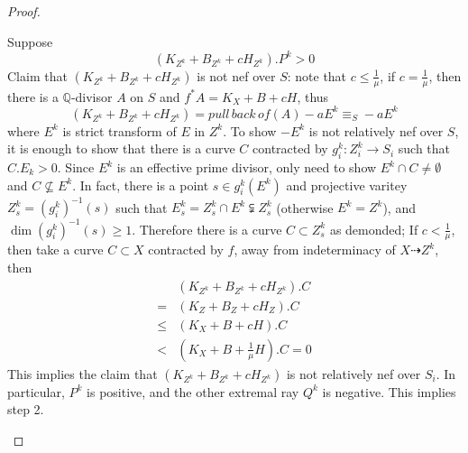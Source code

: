 \documentclass{article}
\begin{document}
\begin{proof}
\begin{enumerate}[Step 1]
Suppose
$$ (K_{Z^k}+B_{Z^k}+cH_{Z^k}).P^k>0 $$
Claim that $ (K_{Z^k}+B_{Z^k}+cH_{Z^k}) $ is not nef over $ S $: note that $ c\leqslant \frac{1}{\mu} $, if $ c=\frac{1}{\mu} $, then there is a $ \mathbb{Q} $-divisor $ A $ on $ S $ and $ f^*A=K_X+B+cH $, thus
$$ (K_{Z^k}+B_{Z^k}+cH_{Z^k})=pull\,back\,of (A)-aE^k\equiv_S -aE^k $$
where $ E^k $ is strict transform of $ E $ in $ Z^k $. To show $ -E^k $ is not relatively nef over $ S $, it is enough to show that there is a curve $ C $ contracted by $ g_i^k:Z^k_i\to S_i $ such that $ C.E_k>0 $.  Since $ E^k $ is an effective prime divisor, only need to show $ E^k\cap C\neq \emptyset $ and $ C\nsubseteq E^k $. In fact, there is a point $ s\in g_i^k(E^k) $ and projective varitey $ Z^k_s=(g_i^k)^{-1}(s) $ such that $ E^k_s=Z^k_s\cap E^k\subsetneqq Z^k_s $ (otherwise $ E^k=Z^k $), and $ \dim (g_i^k)^{-1}(s)\geqslant 1 $. Therefore there is a curve $ C\subset Z^k_s $ as demonded; If $ c<\frac{1}{\mu} $, then take a curve $ C\subset X $ contracted by $ f $, away from indeterminacy of $ X\dashrightarrow Z^k $, then
\begin{equation*}
\begin{aligned}
&(K_{Z^k}+B_{Z^k}+cH_{Z^k}).C\\
=&   (K_{Z}+B_{Z}+cH_{Z}).C\\
\leqslant& (K_{X}+B+cH).C\\
<&(K_X+B+\frac{1}{\mu}H).C=0
\end{aligned}
\end{equation*}
This implies the claim that $ (K_{Z^k}+B_{Z^k}+cH_{Z^k}) $ is not relatively nef over $ S_i $. In particular,  $ P^k $ is positive, and the other extremal ray $ Q^k $ is negative. This implies step 2.


\end{enumerate}
\end{proof}
\end{document}
